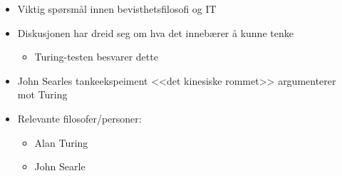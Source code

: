 \begin{itemize}
          \begin{itemize}
              \item Viktig spørsmål innen bevisthetsfilosofi og IT
              \item Diskusjonen har dreid seg om hva det innebærer å kunne tenke
                    \begin{itemize}
                        \item Turing-testen besvarer dette
                    \end{itemize}
              \item John Searles tankeekspeiment <<det kinesiske rommet>> argumenterer \\mot Turing
              \item Relevante filosofer/personer:
                    \begin{itemize}
                        \item Alan Turing
                        \item John Searle
                    \end{itemize}
          \end{itemize}
\end{itemize}